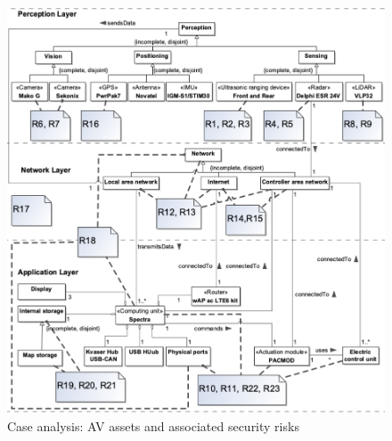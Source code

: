 \documentclass[runningheads]{llncs}
\begin{document}
\begin{figure}[h!]
  \centering
    \vspace{-10pt} 
  \includegraphics[width=0.8\linewidth]{AVassetsCase}
  \caption{Case analysis: AV assets and associated security risks} 
  \label{fig:AssetRiskModel}
   \vspace{-15pt}  
\end{figure}
\end{document}
